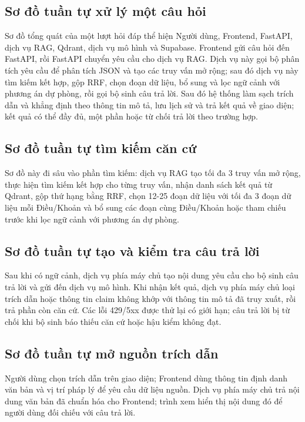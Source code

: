 \documentclass[12pt,a4paper,oneside]{report}
\begin{document}
\subsection{Sơ đồ tuần tự xử lý một câu hỏi}
Sơ đồ tổng quát của một lượt hỏi đáp thể hiện Người dùng, Frontend, FastAPI, dịch vụ RAG, Qdrant, dịch vụ mô hình và Supabase. Frontend gửi câu hỏi đến FastAPI, rồi FastAPI chuyển yêu cầu cho dịch vụ RAG. Dịch vụ này gọi bộ phân tích yêu cầu để phân tích JSON và tạo các truy vấn mở rộng; sau đó dịch vụ này tìm kiếm kết hợp, gộp RRF, chọn đoạn dữ liệu, bổ sung và lọc ngữ cảnh với phương án dự phòng, rồi gọi bộ sinh câu trả lời. Sau đó hệ thống làm sạch trích dẫn và khẳng định theo thông tin mô tả, lưu lịch sử và trả kết quả về giao diện; kết quả có thể đầy đủ, một phần hoặc từ chối trả lời theo trường hợp.

\subsection{Sơ đồ tuần tự tìm kiếm căn cứ}
Sơ đồ này đi sâu vào phần tìm kiếm: dịch vụ RAG tạo tối đa 3 truy vấn mở rộng, thực hiện tìm kiếm kết hợp cho từng truy vấn, nhận danh sách kết quả từ Qdrant, gộp thứ hạng bằng RRF, chọn 12-25 đoạn dữ liệu với tối đa 3 đoạn dữ liệu mỗi Điều/Khoản và bổ sung các đoạn cùng Điều/Khoản hoặc tham chiếu trước khi lọc ngữ cảnh với phương án dự phòng.

\subsection{Sơ đồ tuần tự tạo và kiểm tra câu trả lời}
Sau khi có ngữ cảnh, dịch vụ phía máy chủ tạo nội dung yêu cầu cho bộ sinh câu trả lời và gửi đến dịch vụ mô hình. Khi nhận kết quả, dịch vụ phía máy chủ loại trích dẫn hoặc thông tin claim không khớp với thông tin mô tả đã truy xuất, rồi trả phần còn căn cứ. Các lỗi 429/5xx được thử lại có giới hạn; câu trả lời bị từ chối khi bộ sinh báo thiếu căn cứ hoặc hậu kiểm không đạt.

\subsection{Sơ đồ tuần tự mở nguồn trích dẫn}
Người dùng chọn trích dẫn trên giao diện; Frontend dùng thông tin định danh văn bản và vị trí pháp lý để yêu cầu dữ liệu nguồn. Dịch vụ phía máy chủ trả nội dung văn bản đã chuẩn hóa cho Frontend; trình xem hiển thị nội dung đó để người dùng đối chiếu với câu trả lời.
\end{document}
